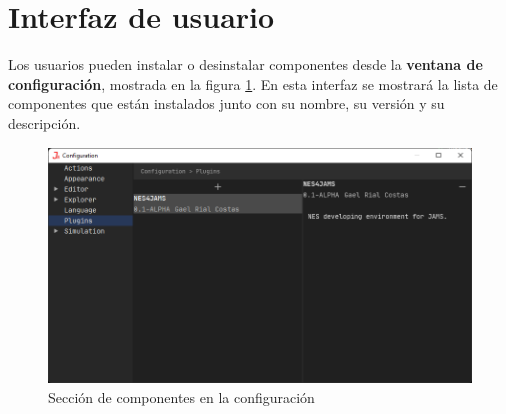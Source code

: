 \section{Interfaz de usuario}\label{sec:interfaz-de-usuario}

Los usuarios pueden instalar o desinstalar componentes
desde la \textbf{ventana de configuración}, mostrada en la figura \ref{fig:plugin-ui}.
En esta interfaz se mostrará la lista de componentes
que están instalados junto con su nombre, su versión
y su descripción.

\begin{figure}[h]
    \centering
    \includegraphics[width=\textwidth]{images/componentes/plugin-ui}
    \caption{Sección de componentes en la configuración}
    \label{fig:plugin-ui}
\end{figure}
